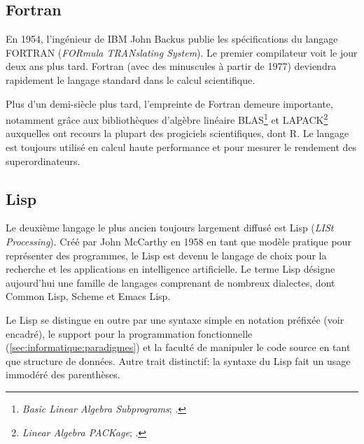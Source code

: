 \subsection{Fortran}
\label{sec:informatique:historique:fortran}

En 1954, l'ingénieur de IBM John Backus publie les spécifications du
langage FORTRAN (\emph{FORmula TRANslating System}). Le
premier compilateur voit le jour deux ans plus tard. Fortran (avec des
minuscules à partir de 1977) deviendra rapidement le langage standard
dans le calcul scientifique.

Plus d'un demi-siècle plus tard, l'empreinte de Fortran demeure
importante, notamment grâce aux bibliothèques d'algèbre linéaire
BLAS\footnote{%
  \emph{Basic Linear Algebra Subprograms};
  .} %
et LAPACK\footnote{%
  \emph{Linear Algebra PACKage};
  .} %
auxquelles ont recours la plupart des progiciels scientifiques, dont
R. Le langage est toujours utilisé en calcul haute performance et pour
mesurer le rendement des superordinateurs.


\subsection{Lisp}
\label{sec:informatique:historique:lisp}

Le deuxième langage le plus ancien toujours largement diffusé est
Lisp (\emph{LISt Processing}). Créé par John McCarthy en
1958 en tant que modèle pratique pour représenter des programmes, le
Lisp est devenu le langage de choix pour la recherche et les
applications en intelligence artificielle. Le terme Lisp désigne
aujourd'hui une famille de langages comprenant de nombreux dialectes,
dont Common Lisp, Scheme et Emacs Lisp.

Le Lisp se distingue en outre par une syntaxe simple en
notation préfixée (voir encadré), le support
pour la programmation fonctionnelle
(\autoref{sec:informatique:paradigmes}) et la faculté de manipuler le
code source en tant que structure de données. Autre trait distinctif:
la syntaxe du Lisp fait un usage immodéré des parenthèses.

